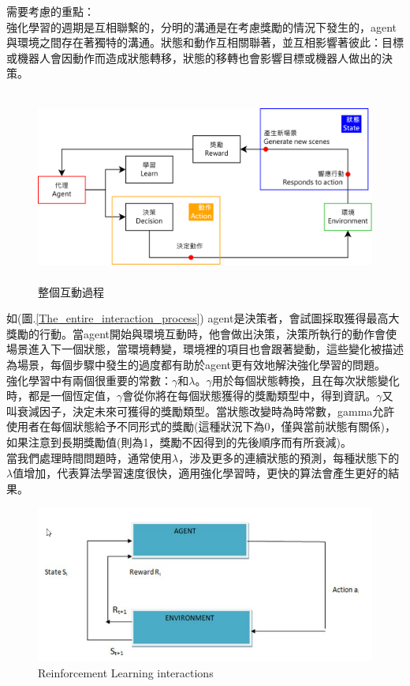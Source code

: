 \documentclass[14pt,a4paper]{report}  %
\begin{document}
需要考慮的重點：\\
強化學習的週期是互相聯繫的，分明的溝通是在考慮獎勵的情況下發生的，agent與環境之間存在著獨特的溝通。狀態和動作互相關聯著，並互相影響著彼此：目標或機器人會因動作而造成狀態轉移，狀態的移轉也會影響目標或機器人做出的決策。\\

\begin{figure}[hbt!]
\begin{center}
\includegraphics[height=6.3cm]{The_entire_interaction_process}
\caption{\Large 整個互動過程 }
\label{整個互動過程 }
\end{center}
\end{figure}
 如(圖.\ref{The_entire_interaction_process}) agent是決策者，會試圖採取獲得最高大獎勵的行動。當agent開始與環境互動時，他會做出決策，決策所執行的動作會使場景進入下一個狀態，當環境轉變，環境裡的項目也會跟著變動，這些變化被描述為場景，每個步驟中發生的過度都有助於agent更有效地解決強化學習的問題。\\
 強化學習中有兩個很重要的常數：$\gamma$和$\lambda$。$\gamma$用於每個狀態轉換，且在每次狀態變化時，都是一個恆定值，$\gamma$會從你將在每個狀態獲得的獎勵類型中，得到資訊。$\gamma$又叫衰減因子，決定未來可獲得的獎勵類型。當狀態改變時為時常數，gamma允許使用者在每個狀態給予不同形式的獎勵(這種狀況下為0，僅與當前狀態有關係)，如果注意到長期獎勵值(則為1，獎勵不因得到的先後順序而有所衰減)。\\
 當我們處理時間問題時，通常使用$\lambda$，涉及更多的連續狀態的預測，每種狀態下的$\lambda$值增加，代表算法學習速度很快，適用強化學習時，更快的算法會產生更好的結果。\\
\iffalse
\begin{figure}[hbt!]
\begin{center}
\includegraphics[scale=0.74]{ Reinforcement_Learning_interactions}
\caption{\Large Reinforcement Learning interactions}
\end{center}
\end{figure}
\end{document}
